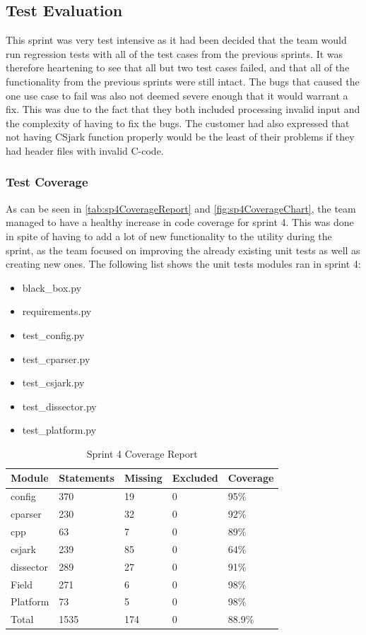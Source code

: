 \subsection{Test Evaluation}
This sprint was very test intensive as it had been decided that the team would run regression tests with all of the test cases from the previous sprints.
It was therefore heartening to see that all but two test cases failed, and that all of the functionality from the previous sprints were still intact.
The bugs that caused the one use case to fail was also not deemed severe enough that it would warrant a fix. This was due to the fact that they both
included processing invalid input and the complexity of having to fix the bugs. The customer had also expressed that not having CSjark function properly
would be the least of their problems if they had header files with invalid C-code.

\subsubsection{Test Coverage}
As can be seen in \autoref{tab:sp4CoverageReport} and \autoref{fig:sp4CoverageChart}, the team managed to have a healthy increase in code coverage for sprint 4. This was done in spite of having to add a lot of new functionality to the utility during the sprint, as the team focused on improving the already existing unit tests as well as creating new ones. The following list shows the unit tests modules ran in sprint 4:

\begin{itemize}
	\item black\_box.py
	\item requirements.py
	\item test\_config.py
	\item test\_cparser.py
	\item test\_csjark.py
	\item test\_dissector.py
	\item test\_platform.py
\end{itemize}

\begin{table}[!htb] \footnotesize \center
	\caption{Sprint 4 Coverage Report\label{tab:sp4CoverageReport}}
	\begin{tabular}{l l l l l}
		\toprule
		Module & Statements & Missing & Excluded & Coverage\\
		\midrule
		config & 370 & 19 & 0 & 95\%\ \\
		cparser & 230 & 32 & 0 & 92\%\ \\
		cpp & 63 & 7 & 0 & 89\%\ \\
		csjark & 239 & 85 & 0 & 64\%\ \\
		dissector & 289 & 27 & 0 & 91\%\ \\
		Field & 271 & 6  & 0 & 98\%\ \\
		Platform & 73 & 5 & 0 & 98\%\ \\
		Total & 1535 & 174 & 0 & 88.9\%\ \\
		\bottomrule
	\end{tabular}
\end{table}

